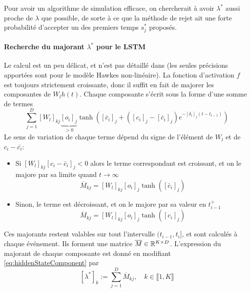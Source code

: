 \documentclass[../main.tex]{subfiles}
\begin{document}
Pour avoir un algorithme de simulation efficace, on chercherait à avoir $\lambda^*$ aussi proche de $\lambda$ que possible, de sorte à ce que la méthode de rejet ait une forte probabilité d'accepter un des premiers temps $s_j^*$ proposés.\footnotemark


\paragraph{Recherche du majorant $\lambda^*$ pour le LSTM} Le calcul est un peu délicat, et n'est pas détaillé dans \autocite{meiEisnerNeuralHawkes} (les seules précisions apportées sont pour le modèle Hawkes non-linéaire).
La fonction d'activation $f$ est toujours strictement croissante, donc il suffit en fait de majorer les composantes de $W_lh(t)$. Chaque composante s'écrit sous la forme d'une somme de termes
\begin{equation}\label{eq:hiddenStateComponent}
	\sum_{j=1}^{D} {[W_l]}_{kj} \underbrace{{[o_i]}_j}_{>0}
	\tanh \left( [\bar{c}_{i}]_j + \left([c_{i}]_j - [\bar{c}_{i}]_j \right)e^{-[\delta_i]_j (t-t_{i-1})}
	\right)
\end{equation}
Le sens de variation de chaque terme dépend du signe de l'élément de $W_l$ et de $c_i - \bar{c_i}$:
\begin{itemize}
	\item Si ${[W_l]}_{kj}{[c_i - \bar{c}_i]}_{j} < 0$ alors le terme correspondant est croissant, et on le majore par sa limite quand $t\to\infty$
	\[
		\overline{M}_{kj} = {[W_l]}_{kj} {[o_i]}_j \tanh \left( [\bar{c}_{i}]_j\right)
	\]
	\item Sinon, le terme est décroissant, et on le majore par sa valeur en $t_{i-1}^{+}$
	\[
		\overline{M}_{kj} = {[W_l]}_{kj} {[o_i]}_j \tanh \left( [c_{i}]_j\right)
	\]
\end{itemize}
Ces majorants restent valables sur tout l'intervalle $(t_{i-1}, t_i]$, et sont calculés à chaque événement. Ils forment une matrice $\overline{M}\in\mathbb{R}^{K\times D}$. L'expression du majorant de chaque composante est donné en modifiant \eqref{eq:hiddenStateComponent} par
\[
	{[\lambda^{*}]}_k := \sum_{j=1}^{D} \overline{M}_{kj},\quad k\in \llbracket 1, K\rrbracket
\]
\end{document}
